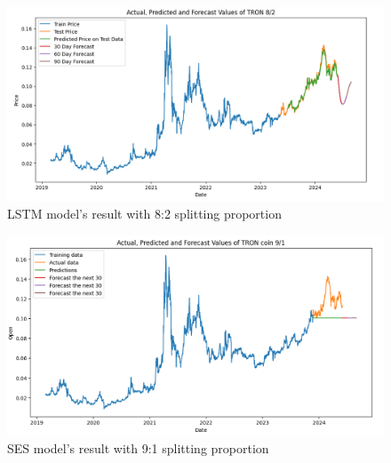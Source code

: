 \documentclass{ieeeojies}
\begin{document}
\vspace{-5mm}
\begin{figure}[H]
  \centering
  \begin{minipage}{0.8\linewidth}
    \centering
    \includegraphics[width=\linewidth]{Image/LSTM/LSTM_TRON_82.png}
    \caption{LSTM model's result with 8:2 splitting proportion}
    \label{fig:9}
  \end{minipage}
\end{figure}
\vspace{-5mm}
\begin{figure}[H]
  \centering
  \begin{minipage}{0.8\linewidth}
    \centering
    \includegraphics[width=\linewidth]{Image/SES/SES_TRON_91.png}
    \caption{SES model's result with 9:1 splitting proportion}
    \label{fig:10}
  \end{minipage}
\end{figure}
\vspace{-5mm}
\end{document}
